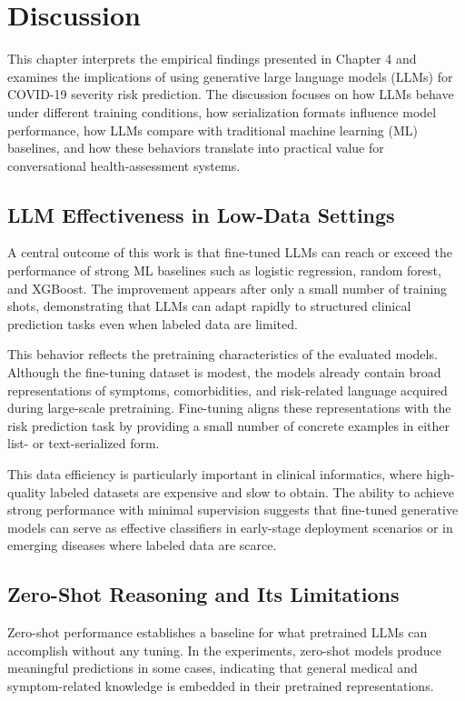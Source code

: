 \section{Discussion}

This chapter interprets the empirical findings presented in Chapter 4 and examines the implications of using generative large language models (LLMs) for COVID-19 severity risk prediction. The discussion focuses on how LLMs behave under different training conditions, how serialization formats influence model performance, how LLMs compare with traditional machine learning (ML) baselines, and how these behaviors translate into practical value for conversational health-assessment systems.

\subsection{LLM Effectiveness in Low-Data Settings}
A central outcome of this work is that fine-tuned LLMs can reach or exceed the performance of strong ML baselines such as logistic regression, random forest, and XGBoost. The improvement appears after only a small number of training shots, demonstrating that LLMs can adapt rapidly to structured clinical prediction tasks even when labeled data are limited.

This behavior reflects the pretraining characteristics of the evaluated models. Although the fine-tuning dataset is modest, the models already contain broad representations of symptoms, comorbidities, and risk-related language acquired during large-scale pretraining. Fine-tuning aligns these representations with the risk prediction task by providing a small number of concrete examples in either list- or text-serialized form.

This data efficiency is particularly important in clinical informatics, where high-quality labeled datasets are expensive and slow to obtain. The ability to achieve strong performance with minimal supervision suggests that fine-tuned generative models can serve as effective classifiers in early-stage deployment scenarios or in emerging diseases where labeled data are scarce.

\subsection{Zero-Shot Reasoning and Its Limitations}
Zero-shot performance establishes a baseline for what pretrained LLMs can accomplish without any tuning. In the experiments, zero-shot models produce meaningful predictions in some cases, indicating that general medical and symptom-related knowledge is embedded in their pretrained representations.

